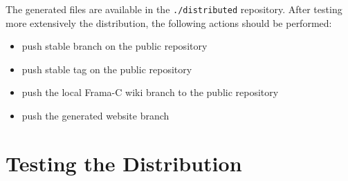 The generated files are available in the \texttt{./distributed} repository.
After testing more extensively the distribution, the following actions should
be performed:

\begin{itemize}
  \item push stable branch on the public repository
  \item push stable tag on the public repository
  \item push the local Frama-C wiki branch to the public repository
  \item push the generated website branch
\end{itemize}

\section{Testing the Distribution}

